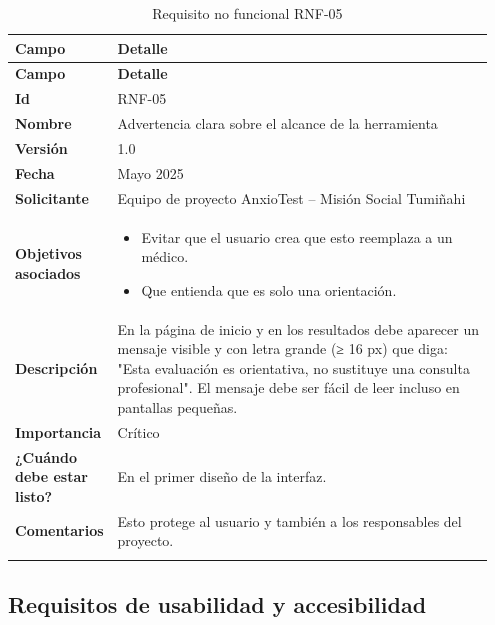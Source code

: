 \begin{longtable}{p{0.15\linewidth} p{0.80\linewidth}}
\toprule
\rowcolor{tableheader!20}
\textbf{Campo} & \textbf{Detalle} \\
\midrule
\endfirsthead
\rowcolor{tableheader!20}
\textbf{Campo} & \textbf{Detalle} \\
\midrule
\endhead
\bottomrule
\endfoot
\textbf{Id} & RNF-05 \\
\textbf{Nombre} & Advertencia clara sobre el alcance de la herramienta \\
\textbf{Versión} & 1.0 \\
\textbf{Fecha} & Mayo 2025 \\
\textbf{Solicitante} & Equipo de proyecto AnxioTest – Misión Social Tumiñahi \\
\textbf{Objetivos asociados} & 
  \begin{itemize}
    \item Evitar que el usuario crea que esto reemplaza a un médico.
    \item Que entienda que es solo una orientación.
  \end{itemize} \\
\textbf{Descripción} & En la página de inicio y en los resultados debe aparecer un mensaje visible y con letra grande (≥ 16 px) que diga: "Esta evaluación es orientativa, no sustituye una consulta profesional". El mensaje debe ser fácil de leer incluso en pantallas pequeñas. \\
\textbf{Importancia} & Crítico \\
\textbf{¿Cuándo debe estar listo?} & En el primer diseño de la interfaz. \\
\textbf{Comentarios} & Esto protege al usuario y también a los responsables del proyecto. \\
\bottomrule
\caption{Requisito no funcional RNF-05}
\end{longtable}

\subsection{Requisitos de usabilidad y accesibilidad}
\label{sec:rnf_usabilidad_accesibilidad}

